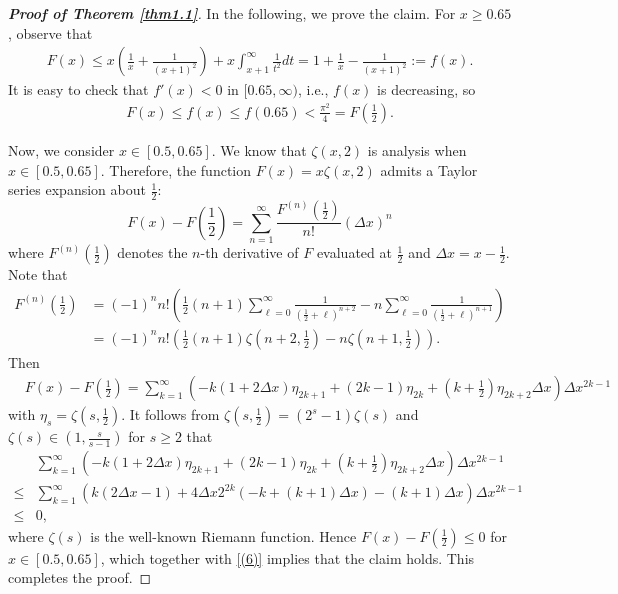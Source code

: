 \documentclass[12pt,psfig,reqno]{amsart}
\numberwithin{equation}{section}
\theoremstyle{plain}
\begin{document}
\begin{proof}[\textbf{Proof of Theorem \ref{thm1.1}}]
In the following, we prove the claim. 
For $x\geq 0.65$, observe that 
\begin{align*}
	F(x)\leq x(\frac1x+\frac{1}{(x+1)^2})+x\int_{x+1}^\infty\frac{1}{t^2}dt
	=1+\frac{1}{x}-\frac{1}{(x+1)^2}:=f(x).
\end{align*}
It is easy to check that $f'(x)<0$  in $[0.65,\infty)$, i.e., $f(x)$ is decreasing, so 
\begin{align}\label{(6)}
	F(x)\leq f(x)\leq f(0.65)<\frac{\pi^2}{4}=F(\frac12). 
\end{align}

Now, we consider $x\in[0.5,0.65]$. 
We know that $\zeta(x,2)$ is analysis when $x\in[0.5,0.65]$. Therefore, the function $F(x)=x\zeta(x,2)$ admits a Taylor series expansion about $\frac12$:
\begin{equation*}
	F(x)-F(\frac12) = \sum_{n=1}^{\infty} \frac{F^{(n)}(\frac12)}{n!}(\Delta x)^n
\end{equation*}
where $F^{(n)}(\frac12)$ denotes the $n$-th derivative of $F$ evaluated at $\frac12$ and $\Delta x=x-\frac12$. 
Note that 
\begin{align*}
	F^{(n)}(\frac12)&=(-1)^n n! \left( \frac12(n+1) \sum_{\ell=0}^\infty \frac{1}{(\frac12+\ell)^{n+2}} - n\sum_{\ell=0}^\infty \frac{1}{(\frac12+\ell)^{n+1}} \right)
	\\
	&=(-1)^n n! \left( \frac12(n+1) \zeta(n+2,\frac12) - n\zeta(n+1,\frac12) \right).
\end{align*}
Then  
\begin{align*}
	&F(x)-F(\frac12) = \sum_{k=1}^{\infty} \left(-k(1+2\Delta x)\eta_{2k+1}+(2k-1)\eta_{2k}+(k+\frac12)\eta_{2k+2}\Delta x\right)\Delta x^{2k-1}
\end{align*}
with $\eta_s=\zeta(s,\frac12)$. 
It follows from  $\zeta(s,\frac12)=(2^s-1)\zeta(s)$ and $\zeta(s)\in(1,\frac{s}{s-1})$ for $s\geq2$  that
\begin{align*}
	&\sum_{k=1}^{\infty} \left(-k(1+2\Delta x)\eta_{2k+1}+(2k-1)\eta_{2k}+(k+\frac12)\eta_{2k+2}\Delta x\right)\Delta x^{2k-1}
	\\
	\leq& \sum_{k=1}^{\infty} \left(k(2\Delta x-1)+4\Delta x2^{2k}(-k+(k+1)\Delta x)-(k+1)\Delta x\right)\Delta x^{2k-1}
	\\
	\leq& 0, 
\end{align*}
 where $\zeta(s)$ is the well-known Riemann function. 
Hence $
	F(x)-F(\frac12)\leq 0
$ for $x\in[0.5,0.65]$, which together with \eqref{(6)} implies that the claim holds. 
This completes the proof. 
\end{proof}
\end{document}
